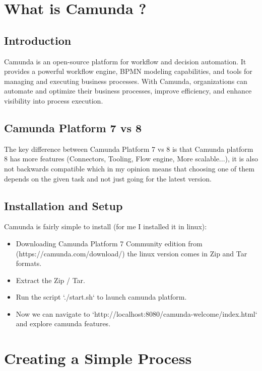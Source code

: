 \documentclass[12pt]{article}
\begin{document}
{\section{What is Camunda ?}

  \subsection{Introduction}

Camunda is an open-source platform for workflow and decision automation. It provides a powerful workflow engine, BPMN modeling capabilities, and tools for managing and executing business processes. With Camunda, organizations can automate and optimize their business processes, improve efficiency, and enhance visibility into process execution.

\pagebreak

  \subsection{Camunda Platform 7 vs 8}

The key difference between Camunda Platform 7 vs 8 is that Camunda platform 8 has more features (Connectors, Tooling, Flow engine, More scalable...), it is also not backwards compatible which in my opinion means that choosing one of them depends on the given task and not just going for the latest version.

  \subsection{Installation and Setup}

Camunda is fairly simple to install (for me I installed it in linux):

  \begin{itemize}
    \item Downloading Camunda Platform 7 Community edition from (https://camunda.com/download/) the linux version comes in Zip and Tar formats.
    \item Extract the Zip / Tar.
    \item Run the script `./start.sh` to launch camunda platform.
    \item Now we can navigate to `http://localhost:8080/camunda-welcome/index.html` and explore camunda features.
  \end{itemize}

\pagebreak

\section{Creating a Simple Process}

}
\end{document}
